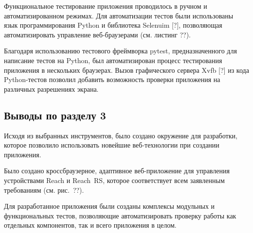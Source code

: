 Функциональное тестирование приложения проводилось в ручном и автоматизированном режимах. Для автоматизации тестов были использованы язык программирования Python и библиотека Selenuim [?], позволяющая автоматизировать управление веб-браузерами (см. листинг ??).

Благодаря использованию тестового фреймворка pytest, предназначенного для написание тестов на Python, был автоматизирован процесс тестирования приложения в нескольких браузерах. Вызов графического сервера Xvfb [?] из кода Python-тестов позволил добавить возможность проверки приложения на различных разрешениях экрана.

{\color{gray}{*listing*}}



\subsection{Выводы по разделу 3}

\begin{dashitemize}
  \item Исходя из выбранных инструментов, было создано окружение для разработки, которое позволило использовать новейшие веб-технологии при создании приложения.
  \item Было создано кроссбраузерное, адаптивное веб-приложение для управления устройствами Reach и Reach~RS, которое соответствует всем заявленным требованиям (см. рис.~??).
  \item Для разработанное приложения были созданы комплексы модульных и функциональных тестов, позволяющие автоматизировать проверку работы как отдельных компонентов, так и всего приложения в целом.
\end{dashitemize}

\newpage
